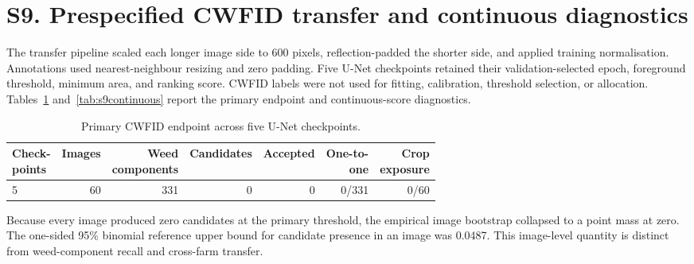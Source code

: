 \documentclass[preprint,12pt]{elsarticle}
\begin{document}
\section{S9. Prespecified CWFID transfer and continuous diagnostics}

The transfer pipeline scaled each longer image side to 600 pixels, reflection-padded the shorter side, and applied training normalisation. Annotations used nearest-neighbour resizing and zero padding. Five U-Net checkpoints retained their validation-selected epoch, foreground threshold, minimum area, and ranking score. CWFID labels were not used for fitting, calibration, threshold selection, or allocation. Tables~\ref{tab:s9locked} and~\ref{tab:s9continuous} report the primary endpoint and continuous-score diagnostics.

\begin{table}[htbp]
\centering
\caption{Primary CWFID endpoint across five U-Net checkpoints.}
\label{tab:s9locked}
\footnotesize
\setlength{\tabcolsep}{4pt}
\begin{tabular}{lrrrrrr}
\toprule
\shortstack{Check-\\points} & Images & \shortstack{Weed\\components} & Candidates & Accepted & \shortstack{One-to-\\one} & \shortstack{Crop\\exposure} \\
\midrule
5 & 60 & 331 & 0 & 0 & 0/331 & 0/60 \\
\bottomrule
\end{tabular}
\end{table}

Because every image produced zero candidates at the primary threshold, the empirical image bootstrap collapsed to a point mass at zero. The one-sided 95\% binomial reference upper bound for candidate presence in an image was 0.0487. This image-level quantity is distinct from weed-component recall and cross-farm transfer.
\end{document}
